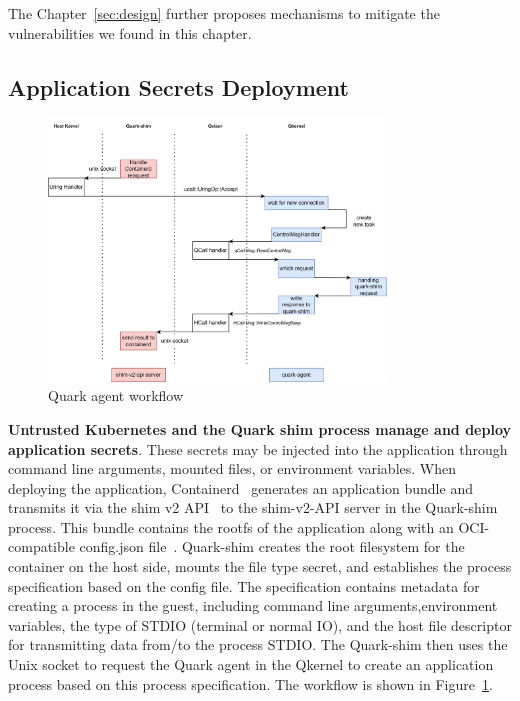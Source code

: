 The Chapter~\ref{sec:design} further proposes mechanisms to mitigate the vulnerabilities we found in this chapter.


\subsection{Application Secrets Deployment}
\begin{figure}[htp]
    \centering
    \includegraphics[width=0.8\textwidth]{images/quark-agent-work-flow.png}
    \caption[Quark Agent Workflow]{Quark agent workflow}
    \label{fig:quark_agent_work_flow}
\end{figure}


\textbf{Untrusted Kubernetes and the Quark shim process manage and deploy application secrets}. 
These secrets may be injected into the application through command line arguments, mounted files, or environment variables. When deploying the application, Containerd~\cite*{containerd} generates an application 
bundle and transmits it via the shim v2 API~\cite*{shim_v2} to the shim-v2-API server in the Quark-shim process. This bundle contains the rootfs of the application along with an OCI-compatible config.json file~\cite*{oci-runtime-spec}. Quark-shim creates the root filesystem for the container on the host side, 
mounts the file type secret, and establishes the process specification based on the config file. The specification contains metadata for creating a process in the guest, including command line arguments,environment variables, the type of STDIO (terminal or normal IO), and the host file descriptor 
for transmitting data from/to the process STDIO. The Quark-shim then uses the Unix socket to request the Quark agent in the Qkernel to create an application process based on this process specification. The workflow is shown in Figure~\ref*{fig:quark_agent_work_flow}.

